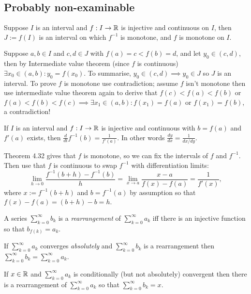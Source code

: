 \begin{multicols}{2}
\end{multicols}



\dotfill

\begin{multicols}{2}
\section*{Probably non-examinable}
\begin{theorem}[4.32]
Suppose $I$ is an interval and $f:I\to\mathbb{R}$ is injective and continuous on $I$, then $J:=f(I)$ is an interval on which $f^{-1}$ is monotone, and $f$ is monotone on $I$.
\end{theorem}
\begin{proof1}
Suppose $a,b\in I$ and $c,d\in J$ with $f(a)=c<f(b)=d$, and let $y_0\in(c,d)$, then by Intermediate value theorem (since $f$ is continuous) $\exists x_0\in(a,b): y_0=f(x_0)$. To summarise, $y_0\in(c,d)\implies y_0\in J$ so $J$ is an interval. To prove $f$ is monotone use contradiction; assume $f$ isn't monotone then use intermediate value theorem again to derive that $f(c)<f(a)<f(b)$ or $f(a)<f(b)<f(c) \implies \exists x_1\in(a,b): f(x_1)=f(a)$ or $f(x_1)=f(b)$, a contradiction!
\end{proof1}

\begin{theorem}
If $I$ is an interval and $f:I\to\mathbb{R}$ is injective and continuous with $b=f(a)$ and $f'(a)$ exists, then $\frac{d}{dt} f^{-1}(b) = \frac{1}{f'(a)}$. In other words $\frac{dy}{dx} = \frac{1}{dx/dy}$.
\end{theorem}
\begin{proof1}
Theorem 4.32 gives that $f$ is monotone, so we can fix the intervals of $f$ and $f^{-1}$. Then use that $f$ is continuous to swap $f^{-1}$ with differentiation limits:
    \[
    \lim_{h\to0}\frac{f^{-1}(b+h)-f^{-1}(b)}{h} = \lim_{x\to a}\frac{x-a}{f(x)-f(a)} = \frac{1}{f'(x)},
    \]
where $x:=f^{-1}(b+h)$ and $b = f^{-1}(a)$ by assumption so that $f(x)-f(a)=(b+h)-b=h$.
\end{proof1}

\begin{definition}
A series $\sum_{k=0}^\infty b_k$ is a \textit{rearrangement} of $\sum_{k=0}^\infty a_k$ iff there is an injective function so that $b_{f(k)}=a_k$.
\end{definition}
\begin{theorem}[6.27]
If $\sum_{k=0}^\infty a_k$ converges \textit{absolutely} and $\sum_{k=0}^\infty b_k$ is a rearrangement then $\sum_{k=0}^\infty b_k=\sum_{k=0}^\infty a_k$.
\end{theorem}
\begin{theorem}[Riemann]
If $x\in\mathbb{R}$ and $\sum_{k=0}^\infty a_k$ is conditionally (but not absolutely) convergent then there is a rearrangement of $\sum_{k=0}^\infty a_k$ so that $\sum_{k=0}^\infty b_k=x$.
\end{theorem}
\end{multicols}